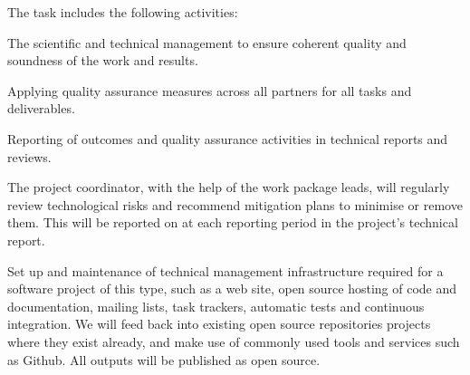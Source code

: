 \begin{workpackage}[id=management,type=MGT,wphases=0-36!.44,
  title=Project Management,
  short=Management,
  lead=SRL,
  MPRM=1,
  QSRM=1,
  IFRRM=1,
  UIORM=1,
  SRLRM=12,
  swsites
]
\begin{tasklist}
\begin{task}[
  title=Technical Project Management,
  id=project-management,
  lead=SRL,
  PM=6,
  wphases={0-36!.166},
  partners={MP,QS,UIO,IFR}
  ]
  The task includes the following activities:
  \begin{compactenum}
\item The scientific and technical management to ensure coherent quality and
  soundness of the work and results.
\item Applying quality assurance measures across all partners for all tasks and
  deliverables.
\item Reporting of outcomes and quality assurance activities in technical
  reports and reviews.
\item The project coordinator, with the help of the work package leads, will
regularly review technological risks and recommend mitigation plans to minimise
or remove them. This will be reported on at each reporting period in the
project's technical report.
\item Set up and maintenance of technical management infrastructure required for
  a software project of this type, such as a web site, open source hosting of code and
  documentation, mailing lists, task trackers, automatic tests and continuous
  integration. We will feed back into existing open source repositories projects
  where they exist already, and make use of commonly used tools and services
  such as Github. All outputs will be published as open source.
\end{compactenum}
\end{task}



\end{tasklist}
\end{workpackage}
